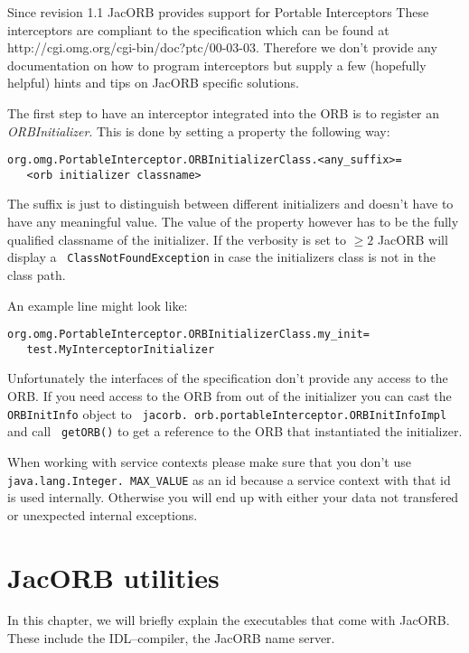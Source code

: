\documentclass[12pt]{scrbook}
\begin{document}
Since revision  1.1 JacORB provides support  for Portable Interceptors
These  interceptors are compliant  to the  specification which  can be
found  at  http://cgi.omg.org/cgi-bin/doc?ptc/00-03-03.  Therefore  we
don't  provide any  documentation on  how to  program  interceptors but
supply a  few (hopefully  helpful) hints and  tips on  JacORB specific
solutions.

The first  step to have an  interceptor integrated into the  ORB is to
register an {\em  ORBInitializer}. This is done by  setting a property
the following way:
\begin{verbatim}org.omg.PortableInterceptor.ORBInitializerClass.<any_suffix>=
   <orb initializer classname>
\end{verbatim}
The suffix  is just to distinguish between  different initializers and
doesn't have to  have any meaningful value. The  value of the property
however has to be the fully qualified classname of the initializer. If
the  verbosity  is  set  to  $\geq  2$  JacORB  will  display  a  {\tt
ClassNotFoundException} in  case the initializers class is  not in the
class path. 

An example line might look like:
\begin{verbatim}org.omg.PortableInterceptor.ORBInitializerClass.my_init=  
   test.MyInterceptorInitializer
\end{verbatim}

Unfortunately the  interfaces of  the specification don't  provide any
access to  the ORB.  If  you need  access to the  ORB from out  of the
initializer  you  can  cast  the  {\tt  ORBInitInfo}  object  to  {\tt
jacorb. orb.portableInterceptor.ORBInitInfoImpl}   and   call  {\tt
getORB()}  to  get  a  reference  to the  ORB  that  instantiated  the
initializer.

When working with service contexts please make sure that you don't use
{\tt  java.lang.Integer. MAX\_VALUE}  as an  id  because a  service
context with  that id  is used internally.  Otherwise you will  end up
with  either   your  data   not  transfered  or   unexpected  internal
exceptions.



\chapter{JacORB utilities}

In this chapter, we will briefly explain the executables that come
with JacORB. These include the IDL--compiler, the JacORB name server.
\end{document}
